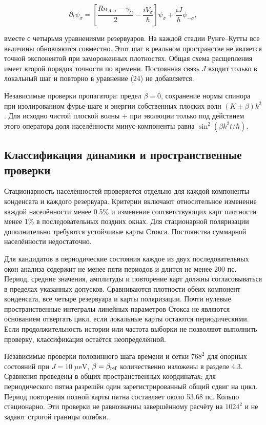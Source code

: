 \documentclass[12pt,a4paper]{article}
\begin{document}
\[
\partial_t\psi_\sigma=
\left[\frac{Rn_{A,\sigma}-\gamma_C}{2}-\frac{iV_\sigma}{\hbar}\right]\psi_\sigma
+\frac{iJ}{\hbar}\psi_{-\sigma},
\tag{26}\label{eq:26}
\]

вместе с четырьмя уравнениями резервуаров. На каждой стадии Рунге--Кутты все величины обновляются совместно. Этот шаг в реальном пространстве не является точной экспонентой при замороженных плотностях. Общая схема расщепления имеет второй порядок точности по времени. Постоянная связь \(J\) входит только в локальный шаг и повторно в уравнение (24) не добавляется.

Независимые проверки пропагатора: предел \(\beta=0\), сохранение нормы спинора при изолированном фурье-шаге и энергии собственных плоских волн \((K\pm\beta)k^2\). Для исходно чистой плоской волны + при эволюции только под действием этого оператора доля населённости минус-компоненты равна \(\sin^2(\beta k^2t/\hbar)\).

\subsection{Классификация динамики и пространственные проверки}

Стационарность населённостей проверяется отдельно для каждой компоненты конденсата и каждого резервуара. Критерии включают относительное изменение каждой населённости менее 0.5\% и изменение соответствующих карт плотности менее 1\% в последовательных поздних окнах. Для стационарной поляризации дополнительно требуются устойчивые карты Стокса. Постоянства суммарной населённости недостаточно.

Для кандидатов в периодические состояния каждое из двух последовательных окон анализа содержит не менее пяти периодов и длится не менее 200 пс. Период, средние значения, амплитуды и повторение карт должны согласовываться в пределах указанных допусков. Сравниваются плотности обеих компонент конденсата, все четыре резервуара и карты поляризации. Почти нулевые пространственные интегралы линейных параметров Стокса не являются основанием отвергать цикл, если локальные карты остаются периодическими. Если продолжительность истории или частота выборки не позволяют выполнить проверку, классификация остаётся неопределённой.

Независимые проверки половинного шага времени и сетки \(768^2\) для опорных состояний при \(J=10\;\mu\mathrm{eV}\), \(\beta=\beta_{\rm ref}\) количественно изложены в разделе 4.3. Сравнения проведены в общих пространственных координатах; для периодического пятна разрешён один зарегистрированный общий сдвиг на цикл. Период повторения полной карты пятна составляет около 53.68 пс. Кольцо стационарно. Эти проверки не равнозначны завершённому расчёту на \(1024^2\) и не задают строгой границы ошибки.
\end{document}
